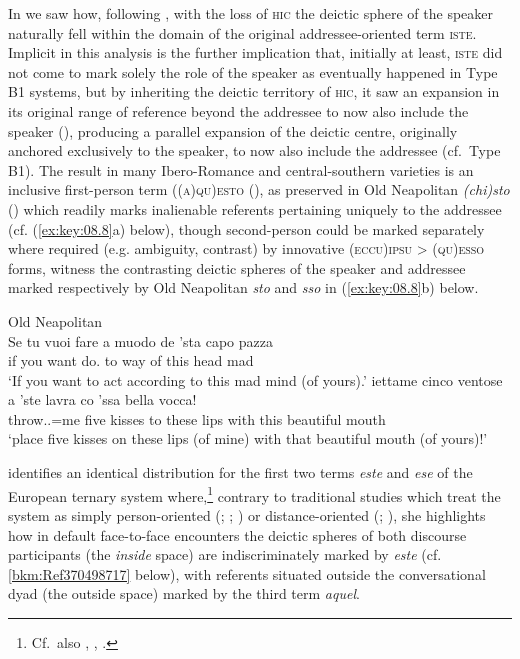 \documentclass[output=paper]{langsci/langscibook}
\begin{document}
In  we saw how, following \citet{Vincent:1999ab}, with the
loss of \textsc{hic} the deictic sphere of the speaker naturally fell within
the domain of the original addressee-oriented term \textsc{iste}. Implicit in
this analysis is the further implication that, initially at least,
\textsc{iste} did not come to mark solely the role of the speaker as eventually
happened in Type B1 systems, but by inheriting the deictic territory
of \textsc{hic,} it saw an expansion in its original range of reference beyond
the addressee to now also include the speaker
(\citealt[91--96]{ledgeway2004sviluppo}), producing a parallel expansion of the
deictic centre, originally anchored exclusively to the speaker, to now also
include the addressee (cf.\ Type B1). The result in many Ibero-Romance
and central-southern  varieties is an inclusive first-person term
\textsc{((a)qu)esto} (\citealt[78--91]{ledgeway2004sviluppo}), as preserved in
Old Neapolitan \emph{(chi)sto} (\citealt[200--205]{Ledgeway:2009a}) which
readily marks inalienable referents pertaining uniquely to the addressee (cf.
(\ref{ex:key:08.8}a) below), though second-person  could be marked separately where required
(e.g. ambiguity, contrast) by innovative (\textsc{eccu})\textsc{ipsu} >
\textsc{(qu)esso} forms, witness the contrasting deictic spheres of the speaker
and addressee marked respectively by Old Neapolitan \emph{sto} and \emph{sso}
in (\ref{ex:key:08.8}b) below.

\ea Old Neapolitan \citep{Ledgeway:2009a}\label{ex:key:08.8}\\
    \ea
    \gll  Se  tu  vuoi  fare  a  muodo  de  ’sta  capo  pazza\\
          if  you  want  do.\Inf{}  to  way  of  this  head  mad\\
    \glt    \enquote*{If you want to act according to this mad mind (of yours).}
    \ex
    \gll  iettame  cinco  ventose  a  ’ste  lavra  co ’ssa  bella  vocca!\\
             throw.\Imp{}.\Ssg{}=me  five  kisses  to  these  lips  with this  beautiful  mouth\\
    \glt \enquote*{place five kisses on these lips (of mine) with that beautiful mouth (of
    yours)!}
    \z
\z

\citet{Jungbluth:2003a,Jungbluth:2017a} identifies an identical distribution
for the first two terms \emph{este} and \emph{ese} of the European 
ternary system where,\footnote{Cf.\ also
    \citet{Gutierrez-Rexach:2002a,Gutierrez-Rexach:2005a},
    \citet[52]{Langacker:1990a},
\citet[245--247]{Gomez-Sanchez:2015a}.\label{fn:08.4}}
    contrary to traditional studies which treat the system as simply
    person-oriented (\citealt[109, 581, 585]{:1970a};
    \citealt[940]{Eguren:1999a}; \citealt[557]{Eguren:2012a}) or
    distance-oriented (\citealt{Hottenroth:1992a};
    \citealt[39]{Diessel1999}), she highlights how in default face-to-face
    encounters the deictic spheres of both discourse participants (the
    \emph{inside} space) are indiscriminately marked by \emph{este} (cf.
    \eqref{bkm:Ref370498717} below), with referents situated outside the conversational dyad (the
    outside space) marked by the third term \emph{aquel}.\newpage
\end{document}
